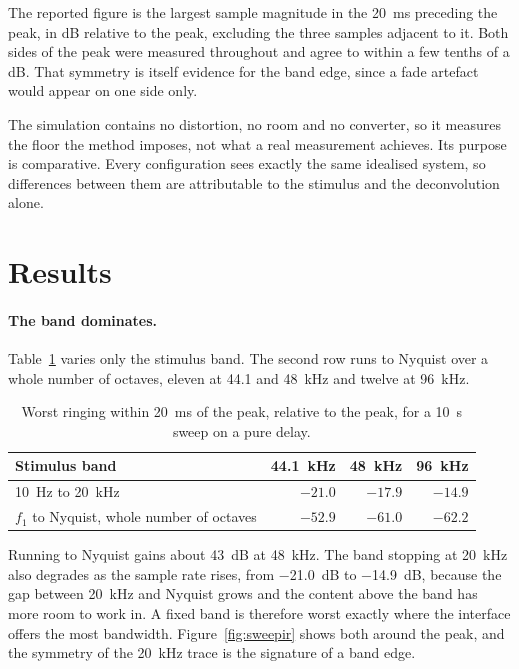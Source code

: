 The reported figure is the largest sample magnitude in the \SI{20}{\milli\second} preceding the peak, in dB relative to the peak, excluding the three samples adjacent to it. Both sides of the peak were measured throughout and agree to within a few tenths of a dB. That symmetry is itself evidence for the band edge, since a fade artefact would appear on one side only.

The simulation contains no distortion, no room and no converter, so it measures the floor the method imposes, not what a real measurement achieves. Its purpose is comparative. Every configuration sees exactly the same idealised system, so differences between them are attributable to the stimulus and the deconvolution alone.

\section{Results}
\paragraph{The band dominates.} Table~\ref{tab:sweepband} varies only the stimulus band. The second row runs to Nyquist over a whole number of octaves, eleven at \SI{44.1}{} and \SI{48}{\kilo\hertz} and twelve at \SI{96}{\kilo\hertz}.

\begin{table}[ht]
\centering
\caption{Worst ringing within \SI{20}{\milli\second} of the peak, relative to the
peak, for a \SI{10}{\second} sweep on a pure delay.}
\label{tab:sweepband}
\begin{tabular}{lrrr}
\toprule
Stimulus band & \SI{44.1}{\kilo\hertz} & \SI{48}{\kilo\hertz} & \SI{96}{\kilo\hertz} \\
\midrule
\SI{10}{\hertz} to \SI{20}{\kilo\hertz}       & $-21.0$ & $-17.9$ & $-14.9$ \\
$f_1$ to Nyquist, whole number of octaves     & $-52.9$ & $-61.0$ & $-62.2$ \\
\bottomrule
\end{tabular}
\end{table}

Running to Nyquist gains about \SI{43}{\dB} at \SI{48}{\kilo\hertz}. The band stopping at \SI{20}{\kilo\hertz} also degrades as the sample rate rises, from \SI{-21.0}{\dB} to \SI{-14.9}{\dB}, because the gap between \SI{20}{\kilo\hertz} and Nyquist grows and the content above the band has more room to work in. A fixed band is therefore worst exactly where the interface offers the most bandwidth. Figure~\ref{fig:sweepir} shows both  around the peak, and the symmetry of the \SI{20}{\kilo\hertz} trace is the signature of a band edge.


